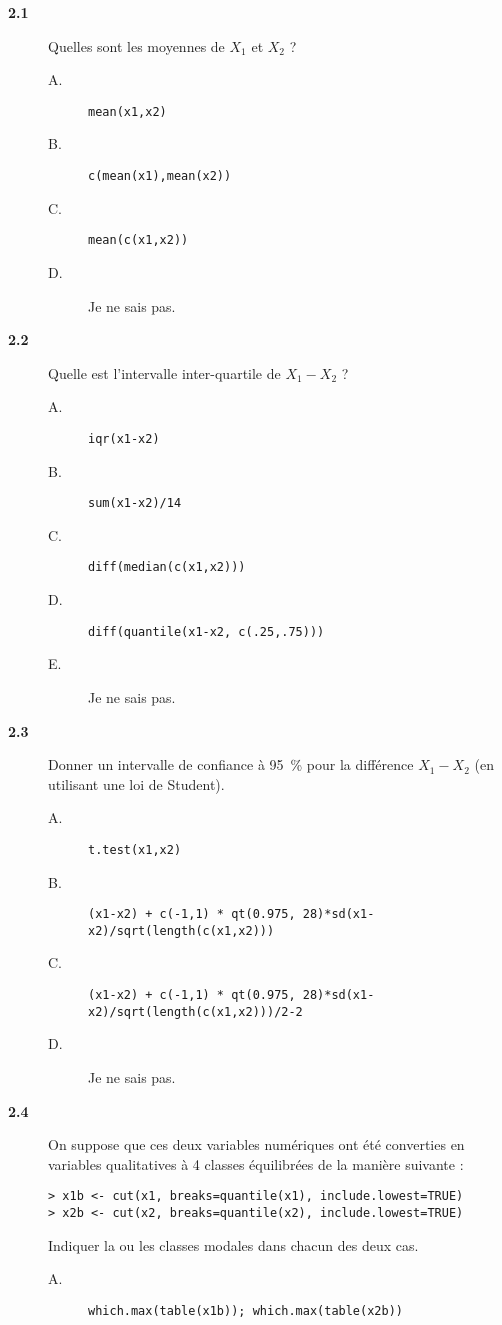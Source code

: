 \documentclass[11pt]{report}
\theoremstyle{definition}
\begin{document}
\begin{description}
\item[\bf 2.1]  Quelles sont les moyennes de $X_1$
  et $X_2$ ?  
  \begin{description}
  \item[A.] \verb|mean(x1,x2)|
  \item[B.] \verb|c(mean(x1),mean(x2))|
  \item[C.] \verb|mean(c(x1,x2))|
  \item[D.] Je ne sais pas.
  \end{description}
\item[\bf 2.2]  Quelle est l'intervalle
  inter-quartile de $X_1-X_2$ ?
  \begin{description}
  \item[A.] \verb|iqr(x1-x2)|
  \item[B.] \verb|sum(x1-x2)/14|
  \item[C.] \verb|diff(median(c(x1,x2)))|
  \item[D.] \verb|diff(quantile(x1-x2, c(.25,.75)))| 
  \item[E.] Je ne sais pas.
  \end{description}
\item[\bf 2.3]  Donner un intervalle de confiance à
  95~\% pour la différence $X_1-X_2$ (en utilisant une loi de Student).
  \begin{description}
  \item[A.] \verb|t.test(x1,x2)|
  \item[B.] \verb|(x1-x2) + c(-1,1) * qt(0.975, 28)*sd(x1-x2)/sqrt(length(c(x1,x2)))|
  \item[C.] \verb|(x1-x2) + c(-1,1) * qt(0.975, 28)*sd(x1-x2)/sqrt(length(c(x1,x2)))/2-2|
  \item[D.] Je ne sais pas.
  \end{description}
\item[\bf 2.4]  On suppose que ces deux variables
  numériques ont été converties en variables qualitatives à 4 classes
  équilibrées de la manière suivante :
\begin{verbatim}
> x1b <- cut(x1, breaks=quantile(x1), include.lowest=TRUE)
> x2b <- cut(x2, breaks=quantile(x2), include.lowest=TRUE) 
\end{verbatim}  
  Indiquer la ou les classes modales dans chacun des deux cas. 
  \begin{description}
  \item[A.] \verb|which.max(table(x1b)); which.max(table(x2b))|

\end{description}
\end{description}
\end{document}
